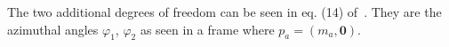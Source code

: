The two additional degrees of freedom can be seen in eq. (14) of~\cite{Byckling:1969sx}. 
They are the azimuthal angles $\varphi_1$, $\varphi_2$ as seen in a frame where $p_a = (m_a, \bm{0})$.   

